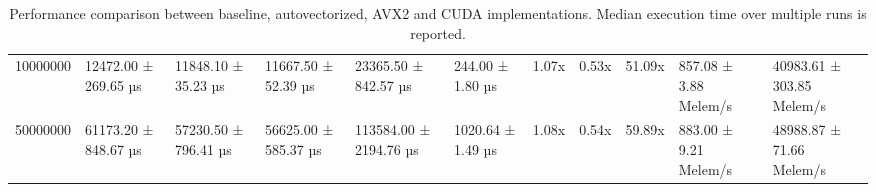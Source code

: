 \begin{table}[htbp]
{\begin{tabular}{rllllllllll}
10000000 & 12472.00 ± 269.65 µs & 11848.10 ± 35.23 µs & 11667.50 ± 52.39 µs & 23365.50 ± 842.57 µs & 244.00 ± 1.80 µs & 1.07x & 0.53x & 51.09x & 857.08 ± 3.88 Melem/s & 40983.61 ± 303.85 Melem/s \\
50000000 & 61173.20 ± 848.67 µs & 57230.50 ± 796.41 µs & 56625.00 ± 585.37 µs & 113584.00 ± 2194.76 µs & 1020.64 ± 1.49 µs & 1.08x & 0.54x & 59.89x & 883.00 ± 9.21 Melem/s & 48988.87 ± 71.66 Melem/s \\
\bottomrule
\end{tabular}
%
}
\caption{Performance comparison between baseline, autovectorized, AVX2 and CUDA implementations. Median execution time over multiple runs is reported.}
\label{tab:performance-comparison}
\end{table}
